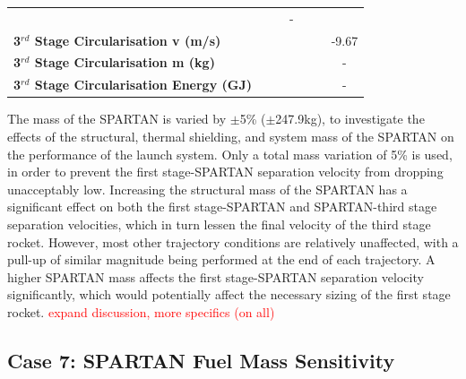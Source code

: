 \begin{table}[ht]
\begin{tabular}{l c c c c c c}
	& \thirdmaxAoAmSPARTANOneHundredTwoFiveNoReturn
	& \thirdmaxAoAmSPARTANOneHundredFiveNoReturn
	& -
	\\
	\textbf{3$^{rd}$ Stage Circularisation v (m/s)}
	& \thirdcircvmSPARTANNinetyFiveNoReturn
	& \thirdcircvmSPARTANNinetySevenFiveNoReturn
	& \thirdcircvmSPARTANStandardNoReturn
	& \thirdcircvmSPARTANOneHundredTwoFiveNoReturn
	& \thirdcircvmSPARTANOneHundredFiveNoReturn
	&-9.67
	\\
	\textbf{3$^{rd}$ Stage Circularisation m (kg)}
	& \thirdcircmmSPARTANNinetyFiveNoReturn
	& \thirdcircmmSPARTANNinetySevenFiveNoReturn
	& \thirdcircmmSPARTANStandardNoReturn
	& \thirdcircmmSPARTANOneHundredTwoFiveNoReturn
	& \thirdcircmmSPARTANOneHundredFiveNoReturn
	& -
	\\
	\textbf{3$^{rd}$ Stage Circularisation Energy (GJ)}
	& \thirdcircEnergymSPARTANNinetyFiveNoReturn
	& \thirdcircEnergymSPARTANNinetySevenFiveNoReturn
	& \thirdcircEnergymSPARTANStandardNoReturn
	& \thirdcircEnergymSPARTANOneHundredTwoFiveNoReturn
	& \thirdcircEnergymSPARTANOneHundredFiveNoReturn
	& -
	\\
	\hline 
\end{tabular} 
	
\end{table}


The mass of the SPARTAN is varied by $\pm$5\% ($\pm$247.9kg), to investigate the effects of the structural, thermal shielding, and system mass of the SPARTAN on the performance of the launch system. Only a total mass variation of 5\% is used, in order to prevent the first stage-SPARTAN separation velocity from dropping unacceptably low. Increasing the structural mass of the SPARTAN has a significant effect on both the first stage-SPARTAN and SPARTAN-third stage separation velocities, which in turn lessen the final velocity of the third stage rocket. However, most other trajectory conditions are relatively unaffected, with a pull-up of similar magnitude being performed at the end of each trajectory. 
A higher SPARTAN mass affects the first stage-SPARTAN separation velocity significantly, which would potentially affect the necessary sizing of the first stage rocket. 
\textcolor{red}{expand discussion, more specifics (on all)}

\subsection{Case 7: SPARTAN Fuel Mass Sensitivity}


